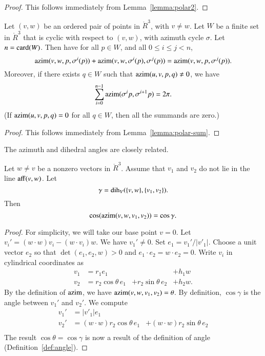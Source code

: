 \begin{proof} This follows immediately from Lemma~\ref{lemma:polar2}.
\end{proof}

\begin{lemma} 
Let $(v,w)$ be an ordered pair of points in $\ring{R}^3$,
with $v\ne w$.  Let $W$ be a finite set in $\ring{R}^3$ that
is cyclic with respect to $(v,w)$,
with azimuth cycle $\sigma$.
Let $n={\operatorname{card}}(W)$.  Then have for all $p\in W$,
and all $0\le i \le j < n$,
   $$
   {\operatorname{azim}}(v,w,p,\sigma^i(p)) +
    {\operatorname{azim}}(v,w,\sigma^i(p),\sigma^j(p)) =
   {\operatorname{azim}}(v,w,p,\sigma^j(p)).
   $$
Moreover, if there exists $q\in W$ such that 
${\operatorname{azim}}(u,v,p,q)\ne0$,
we have 
  $$
  \sum_{i=0}^{n-1} {\operatorname{azim}}(\sigma^ip,\sigma^{i+1}p) = 2\pi.
  $$
(If ${\operatorname{azim}}(u,v,p,q)=0$ for all $q\in W$, then all the
summands are zero.)
\end{lemma}

\begin{proof} This follows immediately from 
Lemma~\ref{lemma:polar-sum}.
\end{proof}


The azimuth and dihedral angles are closely related.  

\begin{lemma}\label{lemma:dih-azim}
Let $w\ne v$ be a nonzero vectors in $\ring{R}^3$.
  Assume that $v_1$ and $v_2$ do not lie in the line ${\operatorname{aff}}(v,w)$.
Let
  $$\gamma = \operatorname{dih}_V(\{v,w\},\{v_1,v_2\}).$$
  Then
    $$
    \cos({\operatorname{azim}}(v,w,v_1,v_2)) = \cos\gamma.
    $$
\end{lemma}

\begin{proof}  For simplicity,
we will take our base point $v=0$.
Let $v_i' = (w\cdot w) v_i - (w\cdot v_i) w$.  
We have $v_1'\ne 0$.  Set $e_1 = v_1'/|v'_1|$.  Choose a unit vector
$e_2$ so that $\det(e_1,e_2,w)>0$ and $e_1\cdot e_2 = w\cdot e_2=0$.
Write $v_i$ in cylindrical coordinates as 
   $$
   \begin{array}{lllll}
     v_1 &= r_1 e_1 &    &+h_1 w\\
     v_2 &= r_2 \cos\theta\, e_1 &+ r_2 \sin\theta\, e_2 &+ h_2 w.
    \end{array}
   $$
By the definition of ${\operatorname{azim}}$, we have ${\operatorname{azim}}(v,w,v_1,v_2)=\theta$.  
By definition, $\cos\gamma$ is the angle between $v_1'$ and $v_2'$.
We compute
   $$
   \begin{array}{lll}
     v_1' &= |v'_1| e_1 \\
     v_2' &= (w\cdot w) r_2 \cos\theta\, e_1 
       &+ (w\cdot w) r_2 \sin\theta\, e_2 \\
     \end{array}
   $$
The result $\cos\theta=\cos\gamma$ 
is now a result of the definition of angle 
(Definition~\ref{def:angle}).
\end{proof}




